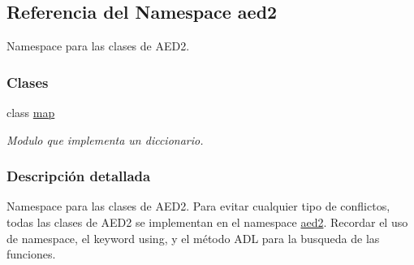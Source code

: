\hypertarget{namespaceaed2}{\subsection{Referencia del Namespace aed2}
\label{namespaceaed2}
}


Namespace para las clases de A\-E\-D2.  


\subsubsection*{Clases}
\begin{DoxyCompactItemize}
\item 
class \hyperlink{classaed2_1_1map}{map}
\begin{DoxyCompactList}\small\item\em Modulo que implementa un diccionario. \end{DoxyCompactList}\end{DoxyCompactItemize}


\subsubsection{Descripción detallada}
Namespace para las clases de A\-E\-D2. Para evitar cualquier tipo de conflictos, todas las clases de A\-E\-D2 se implementan en el namespace \hyperlink{namespaceaed2}{aed2}. Recordar el uso de {\ttfamily namespace}, el keyword {\ttfamily using}, y el método A\-D\-L para la busqueda de las funciones. 